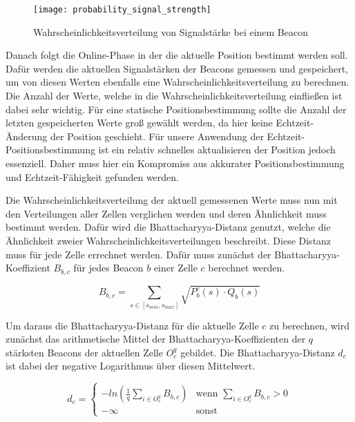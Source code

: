 \begin{figure}[htb!]
		\centering
	\texttt{[image: probability\_signal\_strength]}
	\caption{Wahrscheinlichkeitsverteilung von Signalstärke bei einem Beacon}
	\label{probability-signal-strength-beacon}
\end{figure}

Danach folgt die Online-Phase in der die aktuelle Position bestimmt werden soll. Dafür werden die aktuellen Signalstärken der Beacons gemessen und gespeichert, um von diesen Werten ebenfalls eine Wahrscheinlichkeitsverteilung zu berechnen. Die Anzahl der Werte, welche in die Wahrscheinlichkeitsverteilung einfließen ist dabei sehr wichtig.
Für eine statische Positionsbestimmung sollte die Anzahl der letzten gespeicherten Werte groß gewählt werden, da hier keine Echtzeit-Änderung der Position geschieht.
Für unsere Anwendung der Echtzeit-Positionsbestimmung ist ein relativ schnelles aktualisieren der Position jedoch essenziell. Daher muss hier ein Kompromiss aus akkurater Positionsbestimmung und Echtzeit-Fähigkeit gefunden werden.

Die Wahrscheinlichkeitsverteilung der aktuell gemessenen Werte muss nun mit den Verteilungen aller Zellen verglichen werden und deren Ähnlichkeit muss bestimmt werden. Dafür wird die Bhattacharyya-Distanz genutzt, welche die Ähnlichkeit zweier Wahrscheinlichkeitsverteilungen beschreibt. 
Diese Distanz muss für jede Zelle errechnet werden. 
Dafür muss zunächst der Bhattacharyya-Koeffizient $B_{b, c}$ für jedes Beacon $b$ einer Zelle $c$ berechnet werden.

\begin{equation}
	B_{b, c} = \sum_{s \in [s_{min},s_{max}]} \sqrt{P_{b}^{c}(s) \cdot Q_{b}(s)}
\end{equation}

Um daraus die Bhattacharyya-Distanz für die aktuelle Zelle $c$ zu berechnen, wird zunächst das arithmetische Mittel der Bhattacharyya-Koeffizienten der $q$ stärksten Beacons der aktuellen Zelle $O_{c}^{q}$ gebildet. Die Bhattacharyya-Distanz $d_{c}$ ist dabei der negative Logarithmus über diesen Mittelwert.

\begin{equation}
	d_{c}= \begin{cases}
	-ln (\frac{1}{q} \sum_{i \in O_{c}^{q}} B_{b, c}) & \text{wenn } \sum_{i \in O_{c}^{q}} B_{b, c} > 0 \\
	- \infty & \text{sonst}
	\end{cases}
\end{equation}

